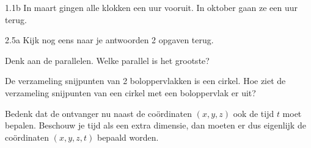 \begin{Hint}{1.1b}
            In maart gingen alle klokken een uur vooruit. In oktober gaan ze een uur terug.
        
\end{Hint}
\begin{Hint}{2.5a}
			Kijk nog eens naar je antwoorden 2 opgaven terug.
		
\end{Hint}
\begin{Hint}{2.14}
		Denk aan de parallelen. Welke parallel is het grootste?
	
\end{Hint}
\begin{Hint}{4.9}
		De verzameling snijpunten van 2 boloppervlakken is een cirkel. Hoe ziet de verzameling snijpunten van een cirkel met een boloppervlak er uit?
	
\end{Hint}
\begin{Hint}{4.15}
		Bedenk dat de ontvanger nu naast de co\"ordinaten $(x, y, z)$ ook de tijd $t$ moet bepalen. Beschouw je tijd als een extra dimensie, dan moeten er dus eigenlijk de co\"ordinaten $(x, y, z, t)$ bepaald worden.
	
\end{Hint}

